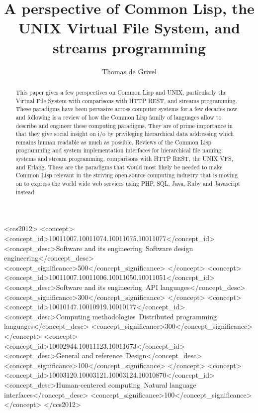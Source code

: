 \documentclass[sigconf]{acmart}
\begin{document}
\title{A perspective of Common Lisp, the UNIX Virtual File System, and streams programming}


\author{Thomas de Grivel}


\begin{abstract}
  This paper gives a few perspectives on Common Lisp and UNIX,
  particularly the Virtual File System with comparisons with HTTP REST,
  and streams programming. These paradigms have been pervasive across
  computer systems for a few decades now and following is a review of
  how the Common Lisp family of languages allow to describe and engineer
  these computing paradigms. They are of prime importance in that they
  give social insight on i/o by privileging hierarchical data addressing
  which remains human readable as much as possible. Reviews of the
  Common Lisp programming and system implementation interfaces for
  hierarchical file naming systems and stream programming, comparisons
  with HTTP REST, the UNIX VFS, and Erlang. These are the paradigms that
  would most likely be needed to make Common Lisp relevant in the
  striving open-source computing industry that is moving on to express
  the world wide web services using PHP, SQL, Java, Ruby and Javascript
  instead.
\end{abstract}


\begin{CCSXML}
<ccs2012>
<concept>
<concept_id>10011007.10011074.10011075.10011077</concept_id>
<concept_desc>Software and its engineering~Software design engineering</concept_desc>
<concept_significance>500</concept_significance>
</concept>
<concept>
<concept_id>10011007.10011006.10011050.10011051</concept_id>
<concept_desc>Software and its engineering~API languages</concept_desc>
<concept_significance>300</concept_significance>
</concept>
<concept>
<concept_id>10010147.10010919.10010177</concept_id>
<concept_desc>Computing methodologies~Distributed programming languages</concept_desc>
<concept_significance>300</concept_significance>
</concept>
<concept>
<concept_id>10002944.10011123.10011673</concept_id>
<concept_desc>General and reference~Design</concept_desc>
<concept_significance>100</concept_significance>
</concept>
<concept>
<concept_id>10003120.10003121.10003124.10010870</concept_id>
<concept_desc>Human-centered computing~Natural language interfaces</concept_desc>
<concept_significance>100</concept_significance>
</concept>
</ccs2012>
\end{CCSXML}
\end{document}
